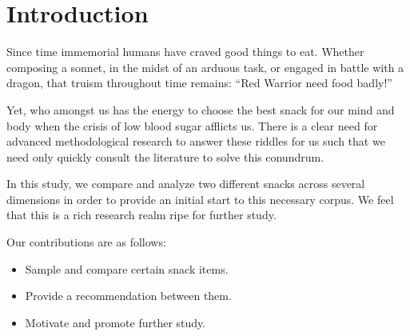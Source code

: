\section{Introduction}

Since time immemorial humans have craved good things to eat.
Whether composing a sonnet, in the midst of an arduous task, or engaged in battle with a dragon, that truism throughout time remains: ``Red Warrior need food badly!''

Yet, who amongst us has the energy to choose the best snack for our mind and body when the crisis of low blood sugar afflicts us.
There is a clear need for advanced methodological research to answer these riddles for us such that we need only quickly consult the literature to solve this conundrum.

In this study, we compare and analyze two different snacks across several dimensions in order to provide an initial start to this necessary corpus.
We feel that this is a rich research realm ripe for further study.

Our contributions are as follows:
\begin{itemize}
    \item Sample and compare certain snack items.
    \item Provide a recommendation between them.
    \item Motivate and promote further study.
\end{itemize}
